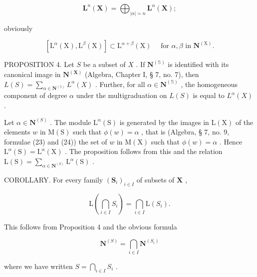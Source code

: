 \[
\mathbf {L} ^ {n} (\mathbf {X}) = \bigoplus_ {| \alpha | = n} \mathbf {L} ^ {\alpha} (\mathbf {X});\tag{14}
\]

obviously

\[
[ \mathrm{L} ^ {\alpha} (\mathrm{X}), \mathrm{L} ^ {\beta} (\mathrm{X}) ] \subset \mathrm{L} ^ {\alpha + \beta} (\mathrm{X}) \quad \text { for } \alpha , \beta \text { in } \mathbf {N} ^ {(\mathrm{X})}.\tag{15}
\]

PROPOSITION 4. Let \(S\) be a subset of \(X\) . If \(\mathbf{N}^{(\mathbb{S})}\) is identified with its canonical image in \(\mathbf{N}^{(\mathbf{X})}\) (Algebra, Chapter I, § 7, no. 7), then \(L(S) = \sum_{\alpha \in \mathbf{N}^{(\mathbb{S})}} L^{\alpha}(X)\) . Further, for all \(\alpha \in \mathbf{N}^{(\mathbb{S})}\) , the homogeneous component of degree \(\alpha\) under the multigraduation on \(L(S)\) is equal to \(L^{\alpha}(X)\) .

 Let \(\alpha \in \mathbf{N}^{(S)}\) . The module \(\mathrm{L}^{\alpha}(\mathrm{S})\) is generated by the images in \(\mathrm{L}(\mathrm{X})\) of the elements \(w\) in \(\mathrm{M}(\mathrm{S})\) such that \(\phi(w) = \alpha\) , that is (Algebra, § 7, no. 9, formulae (23) and (24)) the set of \(w\) in \(\mathrm{M}(\mathrm{X})\) such that \(\phi(w) = \alpha\) . Hence \(\mathrm{L}^{\alpha}(\mathrm{S}) = \mathrm{L}^{\alpha}(\mathrm{X})\) . The proposition follows from this and the relation \(\mathrm{L}(\mathrm{S}) = \sum_{\alpha \in \mathbf{N}^{(S)}}\mathrm{L}^{\alpha}(\mathrm{S})\) .

COROLLARY. For every family \((\mathbf{S}_i)_{i\in I}\) of subsets of \(\mathbf{X}\) ,

\[
\mathrm{L} \left(\bigcap_ {i \in I} S _ {i}\right) = \bigcap_ {i \in I} \mathrm{L} (S _ {i}).\tag{16}
\]

This follows from Proposition 4 and the obvious formula

\[
\mathbf {N} ^ {(S)} = \bigcap_ {i \in I} \mathbf {N} ^ {(S _ {i})}\tag{17}
\]

where we have written \(S = \bigcap_{i \in I} S_i\) .

